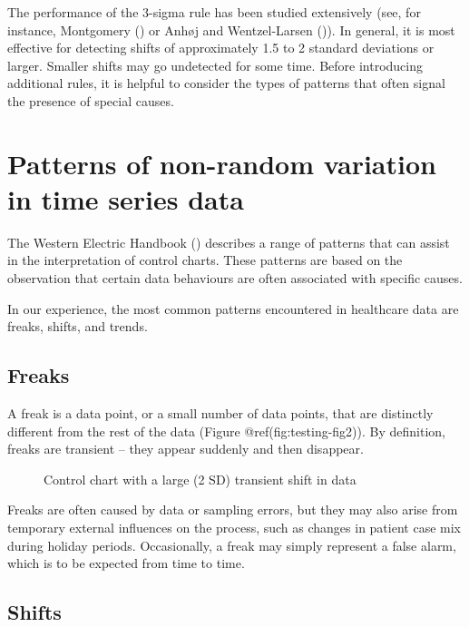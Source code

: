 \documentclass[
]{book}
\makeatletter
\newcommand*\pandocbounded[1]{%
  \sbox\pandoc@box{#1}%
  \Gscale@div\@tempa{\textheight}{\dimexpr\ht\pandoc@box+\dp\pandoc@box\relax}%
  \Gscale@div\@tempb{\linewidth}{\wd\pandoc@box}%
  \ifdim\@tempb\p@<\@tempa\p@\let\@tempa\@tempb\fi%
  \ifdim\@tempa\p@<\p@\scalebox{\@tempa}{\usebox\pandoc@box}%
  \else\usebox{\pandoc@box}%
  \fi%
}
\makeatother
\begin{document}
The performance of the 3-sigma rule has been studied extensively (see,
for instance, Montgomery () or Anhøj
and Wentzel-Larsen ()). In general, it
is most effective for detecting shifts of approximately 1.5 to 2
standard deviations or larger. Smaller shifts may go undetected for some
time. Before introducing additional rules, it is helpful to consider the
types of patterns that often signal the presence of special causes.

\section{Patterns of non-random variation in time series
data}\label{patterns-of-non-random-variation-in-time-series-data}

The Western Electric Handbook
() describes a range
of patterns that can assist in the interpretation of control charts.
These patterns are based on the observation that certain data behaviours
are often associated with specific causes.

In our experience, the most common patterns encountered in healthcare
data are freaks, shifts, and trends.

\subsection{Freaks}\label{freaks}

A freak is a data point, or a small number of data points, that are
distinctly different from the rest of the data (Figure
@ref(fig:testing-fig2)). By definition, freaks are transient -- they
appear suddenly and then disappear.

\begin{figure}
\centering
\pandocbounded{}
\caption{Control chart with a large (2 SD) transient shift in data}
\end{figure}

Freaks are often caused by data or sampling errors, but they may also
arise from temporary external influences on the process, such as changes
in patient case mix during holiday periods. Occasionally, a freak may
simply represent a false alarm, which is to be expected from time to
time.

\subsection{Shifts}\label{shifts}
\end{document}
